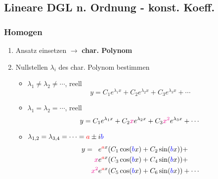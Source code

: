 \subsection{Lineare DGL n. Ordnung - konst. Koeff.}
    \subsubsection{Homogen}\label{sec:konst-koeff-homogen}
        \vspace{0.5em}
        \begin{enumerate}
            \item Ansatz  einsetzen $\to$ \textbf{char. Polynom}
            \item Nullstellen $\lambda_i$ des char. Polynom bestimmen
            \begin{itemize}
                \item $\lambda_1 \neq \lambda_2 \neq \cdots$, reell
                    $$
                        y = C_1 e^{\lambda_1 x} + C_2 e^{\lambda_2 x} + C_3 e^{\lambda_3 x}+ \cdots
                    $$
                \item $\lambda_1 = \lambda_2 = \cdots$, reell
                    $$
                        y = C_1 e^{\lambda_1 x} + C_2 {\color{magenta} x} e^{\lambda_2 x} + C_3 {\color{magenta} x^2} e^{\lambda_3 x} + \cdots
                    $$
                \item $\lambda_{1,2} = \lambda_{3,4} = \cdots = {\color{red}a} \pm i {\color{blue}b}$
                    \begin{align*}
                        y =\phantom{x} &e^{{\color{red}a}x} (C_1 \cos({\color{blue}b}x) + C_2 \sin({\color{blue}b}x)) +\\
                            {\color{magenta} x}&e^{{\color{red}a}x} (C_3 \cos({\color{blue}b}x) + C_4 \sin({\color{blue}b}x))+\\
                            {\color{magenta} x^2}&e^{{\color{red}a}x} (C_5 \cos({\color{blue}b}x) + C_6 \sin({\color{blue}b}x))+ \cdots
                    \end{align*}
            \end{itemize}
        \end{enumerate}
